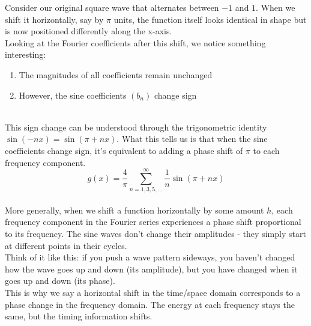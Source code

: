 \documentclass{article}
\begin{document}
Consider our original square wave that alternates between $-1$ and $1$. When we shift it horizontally, say by $\pi$ units, the function itself looks identical in shape but is now positioned differently along the x-axis.\\

Looking at the Fourier coefficients after this shift, we notice something interesting:\\

\begin{enumerate}
\item The magnitudes of all coefficients remain unchanged
\item However, the sine coefficients $(b_n)$ change sign
\end{enumerate}\\

This sign change can be understood through the trigonometric identity $\sin(-nx) = \sin(\pi + nx)$. What this tells us is that when the sine coefficients change sign, it's equivalent to adding a phase shift of $\pi$ to each frequency component.\\
\begin{equation}
g(x) = \frac{4}{\pi} \sum_{n=1,3,5,...}^{\infty} \frac{1}{n} \sin\left(\pi+nx\right)
\end{equation}\\

More generally, when we shift a function horizontally by some amount $h$, each frequency component in the Fourier series experiences a phase shift proportional to its frequency. The sine waves don't change their amplitudes - they simply start at different points in their cycles.\\

Think of it like this: if you push a wave pattern sideways, you haven't changed how the wave goes up and down (its amplitude), but you have changed when it goes up and down (its phase).\\

This is why we say a horizontal shift in the time/space domain corresponds to a phase change in the frequency domain. The energy at each frequency stays the same, but the timing information shifts.
\end{document}
